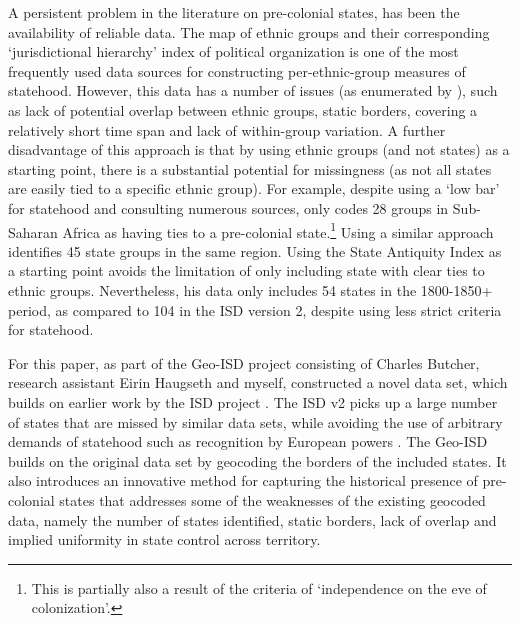 \documentclass[12pt]{article}
\begin{document}
A persistent problem in the literature on pre-colonial states, has been the
availability of reliable data. The \citet{Murdock1967} map of ethnic groups and
their corresponding `jurisdictional hierarchy' index of political organization
is one of the most frequently used data sources for constructing
per-ethnic-group measures of statehood. However, this data has a number of
issues (as enumerated by \citet{Michalopoulos2018}), such as lack of potential
overlap between ethnic groups, static borders, covering a relatively short time
span and lack of within-group variation. A further disadvantage of this approach
is that by using ethnic groups (and not states) as a starting point, there is a
substantial potential for missingness (as not all states are easily tied to a
specific ethnic group). For example, \citet{Paine2019} despite using a `low bar'
for statehood and consulting numerous sources, only codes 28 groups in
Sub-Saharan Africa as having ties to a pre-colonial state.\footnote{This is
partially also a result of the criteria of `independence on the eve of
colonization'.} Using a similar approach \citet{Wig2016} identifies 45 state
groups in the same region. Using the State Antiquity Index
\citep{Bockstette2012} as a starting point \citet{Depetris-Chauvin2016} avoids
the limitation of only including state with clear ties to ethnic groups.
Nevertheless, his data only includes 54 states in the 1800-1850+ period, as
compared to 104 in the ISD version 2, despite using less strict criteria for
statehood.


For this paper, as part of the Geo-ISD project consisting of Charles Butcher,
research assistant Eirin Haugseth and myself, constructed a novel data set,
which builds on earlier work by the ISD project \citep{Butcher2020}. The ISD v2
picks up a large number of states that are missed by similar data sets, while
avoiding the use of arbitrary demands of statehood such as recognition by
European powers \citep{Butcher2020}. The Geo-ISD builds on the original data set
by geocoding the borders of the included states. It also introduces an
innovative method for capturing the historical presence of pre-colonial states
that addresses some of the weaknesses of the existing geocoded data, namely the
number of states identified, static borders, lack of overlap and implied
uniformity in state control across territory.
\end{document}
